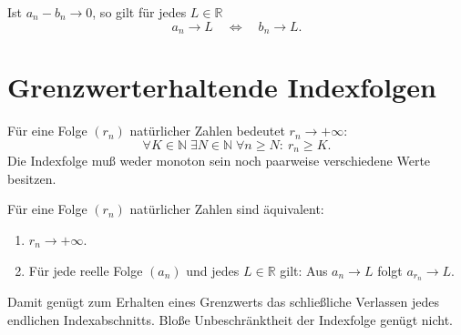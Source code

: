 \begin{theorem}
\label{b21guide:thm:perturbation}
Ist $a_n-b_n\to0$, so gilt für jedes $L\in\mathbb R$
\[
 a_n\to L\quad\Longleftrightarrow\quad b_n\to L.
\]
\end{theorem}

\section{Grenzwerterhaltende Indexfolgen}

\begin{definition}
\label{b21guide:def:escaping-indices}
Für eine Folge $(r_n)$ natürlicher Zahlen bedeutet $r_n\to+\infty$:
\[
 \forall K\in\mathbb N\;\exists N\in\mathbb N\;
 \forall n\geq N:\ r_n\geq K.
\]
Die Indexfolge muß weder monoton sein noch paarweise verschiedene Werte besitzen.
\end{definition}

\begin{theorem}
\label{b21guide:thm:reindex-limit}
Für eine Folge $(r_n)$ natürlicher Zahlen sind äquivalent:
\begin{enumerate}
 \item $r_n\to+\infty$.
 \item Für jede reelle Folge $(a_n)$ und jedes $L\in\mathbb R$
 gilt: Aus $a_n\to L$ folgt $a_{r_n}\to L$.
\end{enumerate}
Damit genügt zum Erhalten eines Grenzwerts das schließliche
Verlassen jedes endlichen Indexabschnitts. Bloße Unbeschränktheit
der Indexfolge genügt nicht.
\end{theorem}
